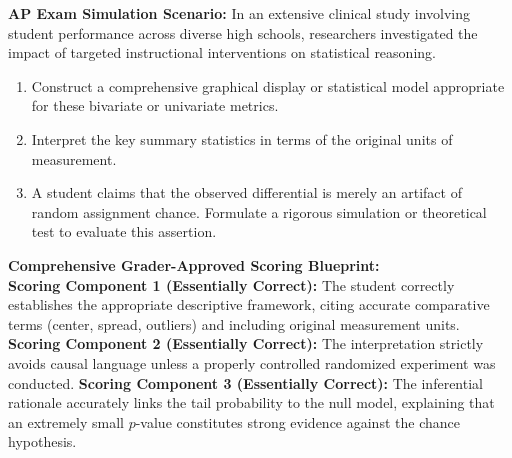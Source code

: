 \begin{workbookbox}
\textbf{AP Exam Simulation Scenario:} In an extensive clinical study involving student performance across diverse high schools, researchers investigated the impact of targeted instructional interventions on statistical reasoning.
\begin{enumerate}[label=(\alph*)]
  \item Construct a comprehensive graphical display or statistical model appropriate for these bivariate or univariate metrics.
  \item Interpret the key summary statistics in terms of the original units of measurement.
  \item A student claims that the observed differential is merely an artifact of random assignment chance. Formulate a rigorous simulation or theoretical test to evaluate this assertion.
\end{enumerate}
\textbf{Comprehensive Grader-Approved Scoring Blueprint:}\\
\textbf{Scoring Component 1 (Essentially Correct):} The student correctly establishes the appropriate descriptive framework, citing accurate comparative terms (center, spread, outliers) and including original measurement units.
\textbf{Scoring Component 2 (Essentially Correct):} The interpretation strictly avoids causal language unless a properly controlled randomized experiment was conducted.
\textbf{Scoring Component 3 (Essentially Correct):} The inferential rationale accurately links the tail probability to the null model, explaining that an extremely small $p$-value constitutes strong evidence against the chance hypothesis.
\end{workbookbox}\vspace{6pt}
